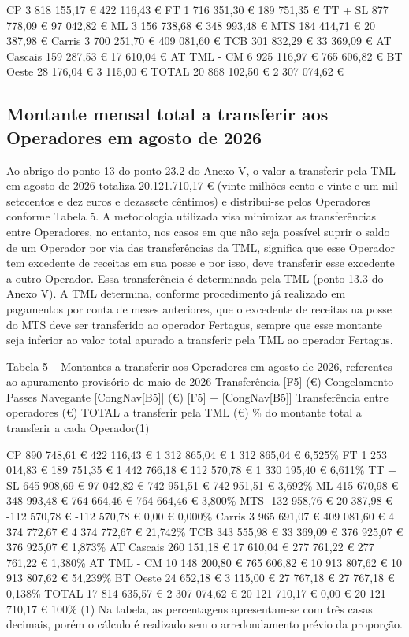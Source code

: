 \documentclass[
  a4paper,
]{article}
\begin{document}
CP 3 818 155,17 € 422 116,43 € FT 1 716 351,30 € 189 751,35 € TT + SL
877 778,09 € 97 042,82 € ML 3 156 738,68 € 348 993,48 € MTS 184 414,71 €
20 387,98 € Carris 3 700 251,70 € 409 081,60 € TCB 301 832,29 € 33
369,09 € AT Cascais 159 287,53 € 17 610,04 € AT TML - CM 6 925 116,97 €
765 606,82 € BT Oeste 28 176,04 € 3 115,00 € TOTAL 20 868 102,50 € 2 307
074,62 €

\subsection{Montante mensal total a transferir aos Operadores em agosto
de
2026}\label{montante-mensal-total-a-transferir-aos-operadores-em-agosto-de-2026}

Ao abrigo do ponto 13 do ponto 23.2 do Anexo V, o valor a transferir
pela TML em agosto de 2026 totaliza 20.121.710,17 € (vinte milhões cento
e vinte e um mil setecentos e dez euros e dezassete cêntimos) e
distribui-se pelos Operadores conforme Tabela 5. A metodologia utilizada
visa minimizar as transferências entre Operadores, no entanto, nos casos
em que não seja possível suprir o saldo de um Operador por via das
transferências da TML, significa que esse Operador tem excedente de
receitas em sua posse e por isso, deve transferir esse excedente a outro
Operador. Essa transferência é determinada pela TML (ponto 13.3 do Anexo
V). A TML determina, conforme procedimento já realizado em pagamentos
por conta de meses anteriores, que o excedente de receitas na posse do
MTS deve ser transferido ao operador Fertagus, sempre que esse montante
seja inferior ao valor total apurado a transferir pela TML ao operador
Fertagus.

Tabela 5 -- Montantes a transferir aos Operadores em agosto de 2026,
referentes ao apuramento provisório de maio de 2026 Transferência
{[}F5{]} (€) Congelamento Passes Navegante {[}CongNav{[}B5{]}{]} (€)
{[}F5{]} + {[}CongNav{[}B5{]}{]} Transferência entre operadores (€)
TOTAL a transferir pela TML (€) \% do montante total a transferir a cada
Operador(1)

CP 890 748,61 € 422 116,43 € 1 312 865,04 € 1 312 865,04 € 6,525\% FT 1
253 014,83 € 189 751,35 € 1 442 766,18 € 112 570,78 € 1 330 195,40 €
6,611\% TT + SL 645 908,69 € 97 042,82 € 742 951,51 € 742 951,51 €
3,692\% ML 415 670,98 € 348 993,48 € 764 664,46 € 764 664,46 € 3,800\%
MTS -132 958,76 € 20 387,98 € -112 570,78 € -112 570,78 € 0,00 € 0,000\%
Carris 3 965 691,07 € 409 081,60 € 4 374 772,67 € 4 374 772,67 €
21,742\% TCB 343 555,98 € 33 369,09 € 376 925,07 € 376 925,07 € 1,873\%
AT Cascais 260 151,18 € 17 610,04 € 277 761,22 € 277 761,22 € 1,380\% AT
TML - CM 10 148 200,80 € 765 606,82 € 10 913 807,62 € 10 913 807,62 €
54,239\% BT Oeste 24 652,18 € 3 115,00 € 27 767,18 € 27 767,18 € 0,138\%
TOTAL 17 814 635,57 € 2 307 074,62 € 20 121 710,17 € 0,00 € 20 121
710,17 € 100\% (1) Na tabela, as percentagens apresentam-se com três
casas decimais, porém o cálculo é realizado sem o arredondamento prévio
da proporção.
\end{document}
